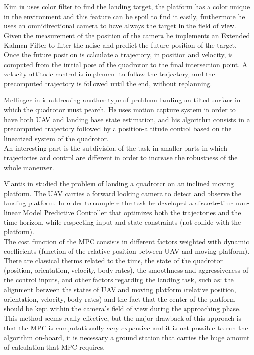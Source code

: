 Kim in \cite{Kim2016} uses color filter to find the landing target, the platform has a color unique in the environment and this feature can be spoil to find it easily, furthermore he uses an omnidirectional camera to have always the target in the field of view. Given the measurement of the position of the camera he implements an Extended Kalman Filter to filter the noise and predict the future position of the target. Once the future position is calculate a trajectory, in position and velocity, is computed from the initial pose of the quadrotor to the final intersection point. A velocity-attitude control is implement to follow the trajectory, and the precomputed trajectory is followed until the end, without replanning.

Mellinger in \cite{mellinger2010control} is addressing another type of problem: landing on tilted surface in which the quadrotor must pearch. He uses  motion capture system in order to have both UAV and landing base state estimation, and his algorithm consists 
in a precomputed trajectory followed by a position-altitude control based on the linearized system of the quadrotor.\\
An interesting part is the subdivision of the task in smaller parts in which trajectories and control are different in order to increase the robustness of the whole maneuver.

Vlantis in \cite{vlantis2015quadrotor} studied the problem of landing a quadrotor on an inclined moving platform. The UAV carries a forward looking camera to detect and observe the landing platform. In order to complete the task he developed a discrete-time non-linear Model Predictive Controller that optimizes both the trajectories and the time horizon, while respecting input and state constraints (not collide with the platform).\\ 
The cost function of the MPC consists in different factors weighted with dynamic coefficients (function of the relative position between UAV and moving platform). There are classical therms related to the time, the state of the quadrotor (position, orientation, velocity, body-rates), the smoothness and aggressiveness of the control inputs, and other factors regarding the landing task, such as: the alignment between the states of UAV and moving platform (relative position, orientation, velocity, body-rates) and the fact that the center of the platform should be kept within the camera's field of view during the approaching phase.\\
This method seems really effective, but the major drawback of this approach is that the MPC is computationally very expensive and it is not possible to run the algorithm on-board, it is necessary a ground station that carries the huge amount of calculation that MPC requires.\\

